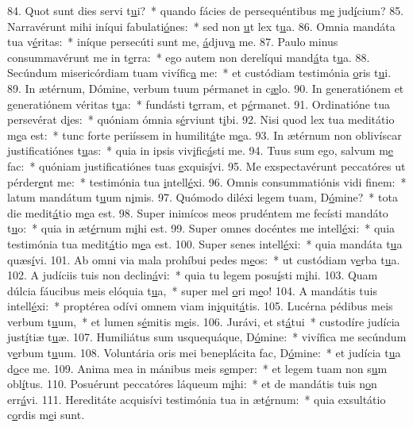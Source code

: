 84. Quot sunt dies servi t\uline{u}i?~* quando fácies de persequéntibus m\uline{e} jud\uline{í}cium?
85. Narravérunt mihi iníqui fabulati\uline{ó}nes:~* sed non \uline{u}t lex t\uline{u}a.
86. Omnia mandáta tua v\uline{é}ritas:~* iníque persecúti sunt me, \uline{á}djuv\uline{a} me.
87. Paulo minus consummavérunt me in t\uline{e}rra:~* ego autem non derelíqui mand\uline{á}ta t\uline{u}a.
88. Secúndum misericórdiam tuam vivífic\uline{a} me:~* et custódiam testimónia \uline{o}ris t\uline{u}i.
89. In ætérnum, Dómine, verbum tuum pérmanet in c\uline{æ}lo.
90. In generatiónem et generatiónem véritas t\uline{u}a:~* fundásti t\uline{e}rram, et p\uline{é}rmanet.
91. Ordinatióne tua persevérat d\uline{i}es:~* quóniam ómnia s\uline{é}rviunt t\uline{i}bi.
92. Nisi quod lex tua meditátio m\uline{e}a est:~* tunc forte periíssem in humilit\uline{á}te m\uline{e}a.
93. In ætérnum non oblivíscar justificatiónes t\uline{u}as:~* quia in ipsis viv\uline{i}fic\uline{á}sti me.
94. Tuus sum ego, salvum m\uline{e} fac:~* quóniam justificatiónes tuas \uline{e}xquis\uline{í}vi.
95. Me exspectavérunt peccatóres ut pérder\uline{e}nt me:~* testimónia tua \uline{i}ntell\uline{é}xi.
96. Omnis consummatiónis vidi f\uline{i}nem:~* latum mandátum t\uline{u}um n\uline{i}mis.
97. Quómodo diléxi legem tuam, D\uline{ó}mine?~* tota die medit\uline{á}tio m\uline{e}a est.
98. Super inimícos meos prudéntem me fecísti mandáto t\uline{u}o:~* quia in æt\uline{é}rnum m\uline{i}hi est.
99. Super omnes docéntes me intell\uline{é}xi:~* quia testimónia tua medit\uline{á}tio m\uline{e}a est.
100. Super senes intell\uline{é}xi:~* quia mandáta t\uline{u}a quæs\uline{í}vi.
101. Ab omni via mala prohíbui pedes m\uline{e}os:~* ut custódiam v\uline{e}rba t\uline{u}a.
102. A judíciis tuis non declin\uline{á}vi:~* quia tu legem posu\uline{í}sti m\uline{i}hi.
103. Quam dúlcia fáucibus meis elóquia t\uline{u}a,~* super mel \uline{o}ri m\uline{e}o!
104. A mandátis tuis intell\uline{é}xi:~* proptérea odívi omnem viam in\uline{i}quit\uline{á}tis.
105. Lucérna pédibus meis verbum t\uline{u}um,~* et lumen s\uline{é}mitis m\uline{e}is.
106. Jurávi, et st\uline{á}tui~* custodíre judícia just\uline{í}tiæ t\uline{u}æ.
107. Humiliátus sum usquequáque, D\uline{ó}mine:~* vivífica me secúndum v\uline{e}rbum t\uline{u}um.
108. Voluntária oris mei beneplácita fac, D\uline{ó}mine:~* et judícia t\uline{u}a d\uline{o}ce me.
109. Anima mea in mánibus meis s\uline{e}mper:~* et legem tuam non s\uline{u}m obl\uline{í}tus.
110. Posuérunt peccatóres láqueum m\uline{i}hi:~* et de mandátis tuis n\uline{o}n err\uline{á}vi.
111. Hereditáte acquisívi testimónia tua in æt\uline{é}rnum:~* quia exsultátio c\uline{o}rdis m\uline{e}i sunt.
